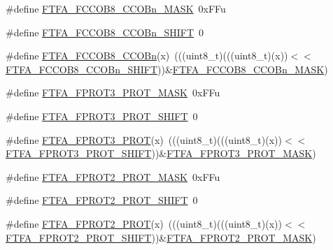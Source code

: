 \begin{DoxyCompactItemize}
\item 
\#define \hyperlink{group___f_t_f_a___register___masks_ga4c40268e4d4ae3bc87a782cbbfc9ec99}{F\+T\+F\+A\+\_\+\+F\+C\+C\+O\+B8\+\_\+\+C\+C\+O\+Bn\+\_\+\+M\+A\+SK}~0x\+F\+Fu
\item 
\#define \hyperlink{group___f_t_f_a___register___masks_ga9603935c5e6f2c1d51b6b4e952e1428a}{F\+T\+F\+A\+\_\+\+F\+C\+C\+O\+B8\+\_\+\+C\+C\+O\+Bn\+\_\+\+S\+H\+I\+FT}~0
\item 
\#define \hyperlink{group___f_t_f_a___register___masks_ga30cf95c2ee60990f4f30e05bd0ee29d8}{F\+T\+F\+A\+\_\+\+F\+C\+C\+O\+B8\+\_\+\+C\+C\+O\+Bn}(x)~(((uint8\+\_\+t)(((uint8\+\_\+t)(x))$<$$<$\hyperlink{group___f_t_f_a___register___masks_ga9603935c5e6f2c1d51b6b4e952e1428a}{F\+T\+F\+A\+\_\+\+F\+C\+C\+O\+B8\+\_\+\+C\+C\+O\+Bn\+\_\+\+S\+H\+I\+FT}))\&\hyperlink{group___f_t_f_a___register___masks_ga4c40268e4d4ae3bc87a782cbbfc9ec99}{F\+T\+F\+A\+\_\+\+F\+C\+C\+O\+B8\+\_\+\+C\+C\+O\+Bn\+\_\+\+M\+A\+SK})
\item 
\#define \hyperlink{group___f_t_f_a___register___masks_gaa5d3fe6e00716f1d147e22799ba5b7ae}{F\+T\+F\+A\+\_\+\+F\+P\+R\+O\+T3\+\_\+\+P\+R\+O\+T\+\_\+\+M\+A\+SK}~0x\+F\+Fu
\item 
\#define \hyperlink{group___f_t_f_a___register___masks_ga35d09e54593dc5d05e0946e9ca3ae42b}{F\+T\+F\+A\+\_\+\+F\+P\+R\+O\+T3\+\_\+\+P\+R\+O\+T\+\_\+\+S\+H\+I\+FT}~0
\item 
\#define \hyperlink{group___f_t_f_a___register___masks_gac94c3029a8dbe39595bf14c61e4a8e95}{F\+T\+F\+A\+\_\+\+F\+P\+R\+O\+T3\+\_\+\+P\+R\+OT}(x)~(((uint8\+\_\+t)(((uint8\+\_\+t)(x))$<$$<$\hyperlink{group___f_t_f_a___register___masks_ga35d09e54593dc5d05e0946e9ca3ae42b}{F\+T\+F\+A\+\_\+\+F\+P\+R\+O\+T3\+\_\+\+P\+R\+O\+T\+\_\+\+S\+H\+I\+FT}))\&\hyperlink{group___f_t_f_a___register___masks_gaa5d3fe6e00716f1d147e22799ba5b7ae}{F\+T\+F\+A\+\_\+\+F\+P\+R\+O\+T3\+\_\+\+P\+R\+O\+T\+\_\+\+M\+A\+SK})
\item 
\#define \hyperlink{group___f_t_f_a___register___masks_ga17b0f04e6c61b3683a99ef21674d8329}{F\+T\+F\+A\+\_\+\+F\+P\+R\+O\+T2\+\_\+\+P\+R\+O\+T\+\_\+\+M\+A\+SK}~0x\+F\+Fu
\item 
\#define \hyperlink{group___f_t_f_a___register___masks_ga7c2381deecb19163451591155ba5a05e}{F\+T\+F\+A\+\_\+\+F\+P\+R\+O\+T2\+\_\+\+P\+R\+O\+T\+\_\+\+S\+H\+I\+FT}~0
\item 
\#define \hyperlink{group___f_t_f_a___register___masks_gab3afd3ff3730b2fa996e86e53260db59}{F\+T\+F\+A\+\_\+\+F\+P\+R\+O\+T2\+\_\+\+P\+R\+OT}(x)~(((uint8\+\_\+t)(((uint8\+\_\+t)(x))$<$$<$\hyperlink{group___f_t_f_a___register___masks_ga7c2381deecb19163451591155ba5a05e}{F\+T\+F\+A\+\_\+\+F\+P\+R\+O\+T2\+\_\+\+P\+R\+O\+T\+\_\+\+S\+H\+I\+FT}))\&\hyperlink{group___f_t_f_a___register___masks_ga17b0f04e6c61b3683a99ef21674d8329}{F\+T\+F\+A\+\_\+\+F\+P\+R\+O\+T2\+\_\+\+P\+R\+O\+T\+\_\+\+M\+A\+SK})
$$
\end{DoxyCompactItemize}
